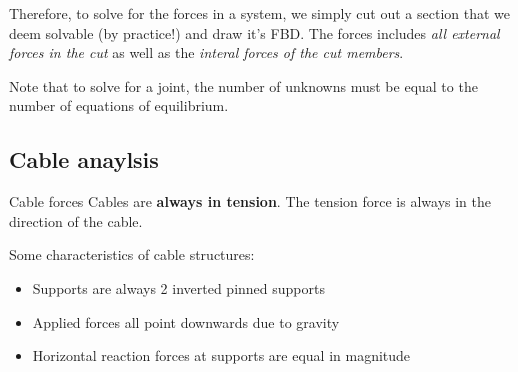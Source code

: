 Therefore, to solve for the forces in a system, we simply cut out a section that we deem solvable (by practice!) and draw it's FBD. The forces includes \emph{all external forces in the cut} as well as the \emph{interal forces of the cut members}.

Note that to solve for a joint, the number of unknowns must be equal to the number of equations of equilibrium.

\subsection{Cable anaylsis}
\begin{definition}
    {Cable forces}
    Cables are \textbf{always in tension}. The tension force is always in the direction of the cable.
\end{definition}
Some characteristics of cable structures:
\begin{itemize}
    \item Supports are always 2 inverted pinned supports
    \item Applied forces all point downwards due to gravity
    \item Horizontal reaction forces at supports are equal in magnitude
\end{itemize}